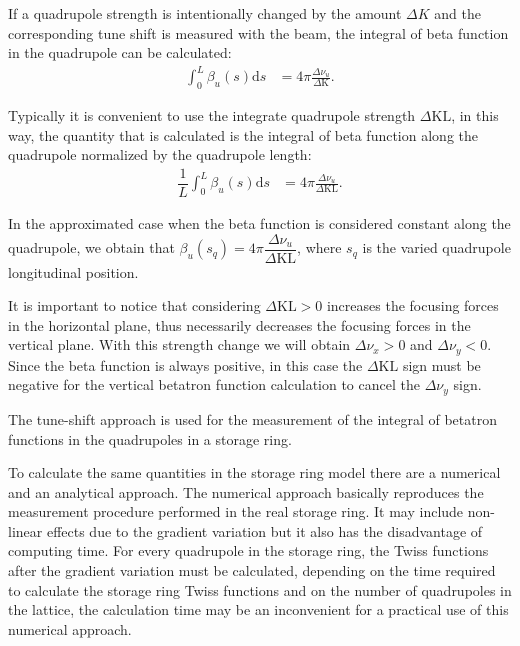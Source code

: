 If a quadrupole strength is intentionally changed by the amount $\Delta K$ and the corresponding tune shift is measured with the beam, the integral of beta function in the quadrupole can be calculated:
\begin{align}
\int_{0}^{L} \beta_u(s) \mathrm{d}s &= 4\pi\frac{\Delta \nu_u}{\Delta \mathrm{K}}.
\end{align}

Typically it is convenient to use the integrate quadrupole strength $\Delta \mathrm{KL}$, in this way, the quantity that is calculated is the integral of beta function along the quadrupole normalized by the quadrupole length:
\begin{align}
\dfrac{1}{L}\int_{0}^{L} \beta_u(s) \mathrm{d}s &= 4\pi\frac{\Delta \nu_u}{\Delta \mathrm{KL}}.
\end{align}

In the approximated case when the beta function is considered constant along the quadrupole, we obtain that $\beta_u(s_q) = 4\pi \dfrac{\Delta \nu_u}{\Delta \mathrm{KL}}$, where $s_q$ is the varied quadrupole longitudinal position.

It is important to notice that considering $\Delta \mathrm{KL} > 0$ increases the focusing forces in the horizontal plane, thus necessarily decreases the focusing forces in the vertical plane. With this strength change we will obtain $\Delta \nu_x > 0$ and $\Delta \nu_y < 0$. Since the beta function is always positive, in this case the $\Delta \mathrm{KL}$ sign must be negative for the vertical betatron function calculation to cancel the $\Delta \nu_y$ sign.

The tune-shift approach is used for the measurement of the integral of betatron functions in the quadrupoles in a storage ring.

To calculate the same quantities in the storage ring model there are a numerical and an analytical approach. The numerical approach basically reproduces the measurement procedure performed in the real storage ring. It may include non-linear effects due to the gradient variation but it also has the disadvantage of computing time. For every quadrupole in the storage ring, the Twiss functions after the gradient variation must be calculated, depending on the time required to calculate the storage ring Twiss functions and on the number of quadrupoles in the lattice, the calculation time may be an inconvenient for a practical use of this numerical approach.

